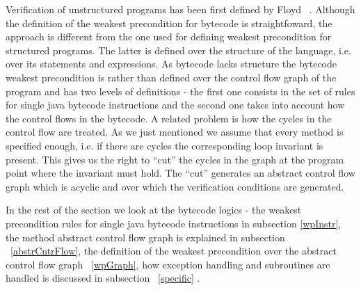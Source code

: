 Verification of unstructured programs has been first defined by Floyd ~\cite{F67amp}. Although the definition of the weakest precondition for bytecode is straightfoward, the approach is different from the one used for defining weakest precondition for structured programs. The latter is defined over the structure of the language, i.e. over its statements and expressions. As bytecode lacks structure the bytecode weakest precondition is rather than defined over the control flow graph of the program and has two levels of definitions - the first one consists in the set of rules for single java bytecode instructions and the second one takes into account how the control flows in the bytecode. A related problem is how the cycles in the control flow are treated. 
As we just mentioned we assume that every method is specified enough, i.e. if there are cycles the corresponding 
loop invariant is present. This gives us the right to ``cut'' the cycles in the graph at the program point where the invariant must hold. 
The ``cut'' generates an abstract control flow graph which is acyclic and over which the verification conditions are generated.  

In the rest of the section we look at the bytecode logics - the weakest precondition rules for single java bytecode instructions in subsection \ref{wpInstr}, the method abstract control flow graph is explained in subsection ~\ref{abstrCntrFlow}, the definition of the weakest precondition over the abstract control flow graph ~\ref{wpGraph}, how exception handling and subroutines are handled is discussed in subsection ~\ref{specific} .











